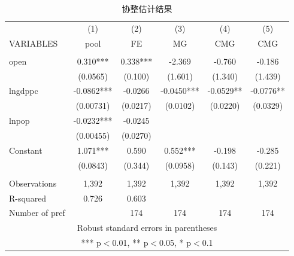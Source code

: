 \documentclass[10pt]{article}
\begin{document}
    \begin{table}[ht]
        \begin{center}
        \caption{协整估计结果} \label{tb:coint}
            \begin{tabular}{lccccc} \hline \hline
             & (1) & (2) & (3) & (4) & (5) \\
            VARIABLES & pool & FE & MG & CMG & CMG \\ \hline
             &  &  &  &  &  \\
            open & 0.310*** & 0.338*** & -2.369 & -0.760 & -0.186 \\
             & (0.0565) & (0.100) & (1.601) & (1.340) & (1.439) \\
            lngdppc & -0.0862*** & -0.0266 & -0.0450*** & -0.0529** & -0.0776** \\
             & (0.00731) & (0.0217) & (0.0102) & (0.0220) & (0.0329) \\
            lnpop & -0.0232*** & -0.0245 &  &  &  \\
             & (0.00455) & (0.0270) &  &  &  \\
            Constant & 1.071*** & 0.590 & 0.552*** & -0.198 & -0.285 \\
             & (0.0843) & (0.344) & (0.0958) & (0.143) & (0.221) \\
             &  &  &  &  &  \\
            Observations & 1,392 & 1,392 & 1,392 & 1,392 & 1,392 \\
            R-squared & 0.726 & 0.603 &  &  &  \\
             Number of pref &  & 174 & 174 & 174 & 174 \\ \hline \hline
            \multicolumn{6}{c}{ Robust standard errors in parentheses} \\
            \multicolumn{6}{c}{ *** p$<$0.01, ** p$<$0.05, * p$<$0.1} \\
        \end{tabular}
        \end{center}
    \end{table}
\clearpage

\end{document}
